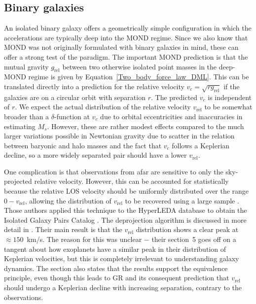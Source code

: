 \documentclass[fleqn,usenatbib,useAMS]{mnras} %
\begin{document}
\subsection{Binary galaxies}
\label{Binary_galaxies}

An isolated binary galaxy offers a geometrically simple configuration in which the accelerations are typically deep into the MOND regime. Since we also know that MOND was not originally formulated with binary galaxies in mind, these can offer a strong test of the paradigm. The important MOND prediction is that the mutual gravity $g_\text{rel}$ between two otherwise isolated point masses in the deep-MOND regime is given by Equation~\ref{Two_body_force_law_DML}. This can be translated directly into a prediction for the relative velocity $v_c = \sqrt{r g_\text{rel}}$ if the galaxies are on a circular orbit with separation $r$. The predicted $v_c$ is independent of $r$. We expect the actual distribution of the relative velocity $v_{\text{rel}}$ to be somewhat broader than a $\delta$-function at $v_c$ due to orbital eccentricities and inaccuracies in estimating $M_s$. However, these are rather modest effects compared to the much larger variations possible in Newtonian gravity due to scatter in the relation between baryonic and halo masses and the fact that $v_c$ follows a Keplerian decline, so a more widely separated pair should have a lower $v_{\text{rel}}$.

One complication is that observations from afar are sensitive to only the sky-projected relative velocity. However, this can be accounted for statistically because the relative LOS velocity should be uniformly distributed over the range $0-v_{\text{rel}}$, allowing the distribution of $v_{\text{rel}}$ to be recovered using a large sample \citep{Nottale_2018_method}. Those authors applied this technique to the HyperLEDA database \citep{Makarov_2014} to obtain the Isolated Galaxy Pairs Catalog \citep[IGPC;][]{Nottale_2018_catalogue}. The deprojection algorithm is discussed in more detail in \citet{Nottale_2020}. Their main result is that the $v_{\text{rel}}$ distribution shows a clear peak at $\approx 150$~km/s. The reason for this was unclear $-$ their section~5 goes off on a tangent about how exoplanets have a similar peak in their distribution of Keplerian velocities, but this is completely irrelevant to understanding galaxy dynamics. The section also states that the results support the equivalence principle, even though this leads to GR and its consequent prediction that $v_{\text{rel}}$ should undergo a Keplerian decline with increasing separation, contrary to the observations.
\end{document}
